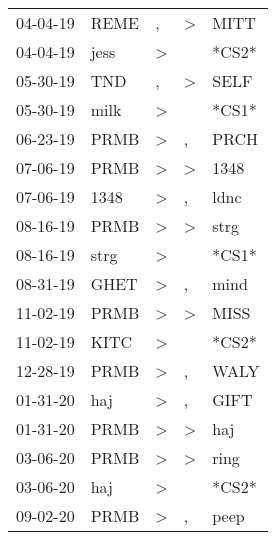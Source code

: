 \begin{supertabular}{lllll}
 04-04-19 &   REME &                , &     \textgreater &   MITT \\
 04-04-19 &   jess &     \textgreater &                  &  *CS2* \\
 05-30-19 &    TND &                , &     \textgreater &   SELF \\
 05-30-19 &   milk &     \textgreater &                  &  *CS1* \\
 06-23-19 &   PRMB &     \textgreater &                , &   PRCH \\
 07-06-19 &   PRMB &     \textgreater &     \textgreater &   1348 \\
 07-06-19 &   1348 &     \textgreater &                , &   ldnc \\
 08-16-19 &   PRMB &     \textgreater &     \textgreater &   strg \\
 08-16-19 &   strg &     \textgreater &                  &  *CS1* \\
 08-31-19 &   GHET &     \textgreater &                , &   mind \\
 11-02-19 &   PRMB &     \textgreater &     \textgreater &   MISS \\
 11-02-19 &   KITC &     \textgreater &                  &  *CS2* \\
 12-28-19 &   PRMB &     \textgreater &                , &   WALY \\
 01-31-20 &    haj &     \textgreater &                , &   GIFT \\
 01-31-20 &   PRMB &     \textgreater &     \textgreater &    haj \\
 03-06-20 &   PRMB &     \textgreater &     \textgreater &   ring \\
 03-06-20 &    haj &     \textgreater &                  &  *CS2* \\
 09-02-20 &   PRMB &     \textgreater &                , &   peep \\
\end{supertabular}
